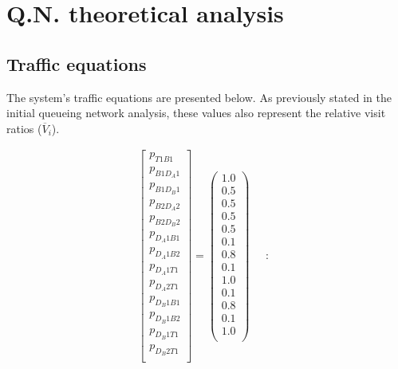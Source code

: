 \section{Q.N. theoretical analysis}

\subsection{Traffic equations}

The system's traffic equations are presented below. 
As previously stated in the initial queueing network analysis, these values also represent the relative visit ratios ($\overline{V}_{i}$).

\[
	\begin{array}{c}
		\begin{bmatrix}
		p_{T1B1} \\
		p_{B1D_{A}1} \\
		p_{B1D_{B}1} \\
		p_{B2D_{A}2} \\
		p_{B2D_{B}2} \\
		p_{D_{A}1B1} \\
		p_{D_{A}1B2} \\
		p_{D_{A}1T1} \\
		p_{D_{A}2T1} \\
		p_{D_{B}1B1} \\
		p_{D_{B}1B2} \\
		p_{D_{B}1T1} \\
		p_{D_{B}2T1} \\
		\end{bmatrix}
		=
		\begin{pmatrix}
		1.0 \\
		0.5 \\
		0.5 \\
		0.5 \\
		0.5 \\
		0.1 \\
		0.8 \\
		0.1 \\
		1.0 \\
		0.1 \\
		0.8 \\
		0.1 \\
		1.0 \\
		\end{pmatrix}
		\end{array}
		\quad : \quad
\]

